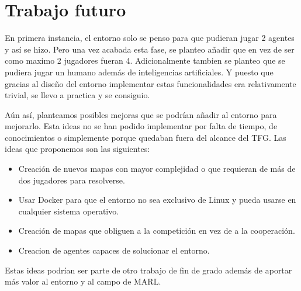 \section{Trabajo futuro}

En primera instancia, el entorno solo se penso para que pudieran jugar 2 agentes y así se hizo. Pero una vez acabada esta fase, se planteo añadir que en vez de ser como maximo 2 jugadores fueran 4. Adicionalmente tambien se planteo que se pudiera jugar un humano además de inteligencias artificiales. Y puesto que gracias al diseño del entorno implementar estas funcionalidades era relativamente trivial, se llevo a practica y se consiguio.

Aún así, planteamos posibles mejoras que se podrían añadir al entorno para mejorarlo. Esta ideas no se han podido implementar por falta de tiempo, de conocimientos o simplemente porque quedaban fuera del alcance del TFG. Las ideas que proponemos son las siguientes:

\begin{itemize}
    \item Creación de nuevos mapas con mayor complejidad o que requieran de más de dos jugadores para resolverse.
    \item Usar Docker para que el entorno no sea exclusivo de Linux y pueda usarse en cualquier sistema operativo.
    \item Creación de mapas que obliguen a la competición en vez de a la cooperación.
    \item Creacion de agentes capaces de solucionar el entorno.
\end{itemize}

Estas ideas podrían ser parte de otro trabajo de fin de grado además de aportar más valor al entorno y al campo de MARL.